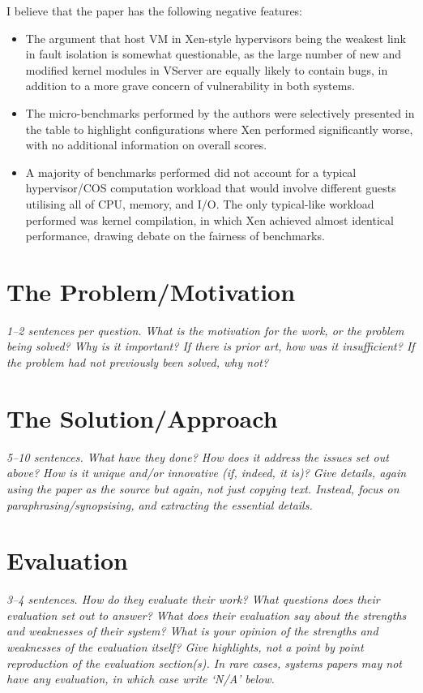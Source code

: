 \documentclass[11pt]{article}
\begin{document}
I believe that the paper has the following negative features:
\begin{itemize}
	\item The argument that host VM in Xen-style hypervisors being the weakest link in fault isolation is somewhat questionable, as the large number of new and modified kernel modules in VServer are equally likely to contain bugs, in addition to a more grave concern of vulnerability in both systems.
	\item The micro-benchmarks performed by the authors were selectively presented in the table to highlight configurations where Xen performed significantly worse, with no additional information on overall scores.
	\item A majority of benchmarks performed did not account for a typical hypervisor/COS computation workload that would involve different guests utilising all of CPU, memory, and I/O. The only typical-like workload performed was kernel compilation, in which Xen achieved almost identical performance, drawing debate on the fairness of benchmarks.
\end{itemize}

\section*{The Problem/Motivation}
\textsl{1--2 sentences per question. What is the motivation for the work, or the problem being solved? Why is it important? If there is prior art, how was it insufficient? If the problem had not previously been solved, why not?}


\section*{The Solution/Approach}
\textsl{5--10 sentences. What have they done? How does it address the issues set out above? How is it unique and/or innovative (if, indeed, it is)? Give details, again using the paper as the source but again, not just copying text. Instead, focus on paraphrasing/synopsising, and extracting the essential details.}


\section*{Evaluation}
\textsl{3--4 sentences. How do they evaluate their work? What questions does their evaluation set out to answer? What does their evaluation say about the strengths and weaknesses of their system? What is your opinion of the strengths and weaknesses of the evaluation itself?  Give highlights, not a point by point reproduction of the evaluation section(s). In rare cases, systems papers may not have any evaluation, in which case write `N/A' below.}
\end{document}
